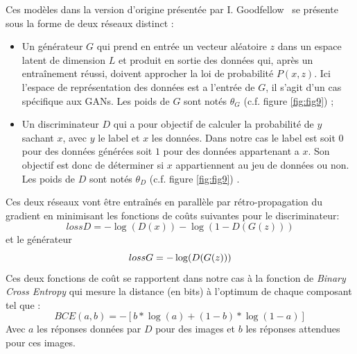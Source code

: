 \documentclass[11pt,francais]{article}
\begin{document}
Ces modèles dans la version d'origine présentée par I. Goodfellow~\cite{NIPS2014_5423} se présente sous la forme de deux réseaux distinct : \\
\begin{itemize}
  \item Un générateur \(G\) qui prend en entrée un vecteur aléatoire \(z\) dans un espace latent de dimension \(L\) et produit en sortie des données qui, après un entraînement réussi, doivent approcher la loi de probabilité \(P(x,z)\). Ici l'espace de représentation des données est a l'entrée de \(G\), il s'agit d'un cas spécifique aux GANs. Les poids de \(G\) sont notés \(\theta_G\) (c.f. figure \ref{fig:fig9}) ;
  
  \item Un discriminateur \(D\) qui a pour objectif de calculer la probabilité de \(y\) sachant \(x\), avec \(y\) le label et \(x\) les données. Dans notre cas le label est soit \(0\) pour des données générées soit \(1\) pour des données appartenant a \(x\). Son objectif est donc de déterminer si \(x\) appartiennent au jeu de données ou non. Les poids de \(D\) sont notés \(\theta_D\) (c.f. figure \ref{fig:fig9}) .
\end{itemize}
Ces deux réseaux vont être entraînés en parallèle par rétro-propagation du gradient en minimisant les fonctions de coûts suivantes pour le discriminateur:
$$
lossD = -\log(D(x)) - \log(1-D(G(z))) 
$$
et le générateur
$$
lossG = -\log(D(G(z)))  \\
$$
Ces deux fonctions de coût se rapportent dans notre cas à la fonction de \textit{Binary Cross Entropy} qui mesure la distance (en bits) à l'optimum de chaque composant tel que : 
\[
BCE(a, b) = -[b * \log(a) + (1 - b) * \log(1 - a)]
\]
Avec \(a\) les réponses données par \(D\) pour des images et \(b\) les réponses attendues pour ces images.
\end{document}
